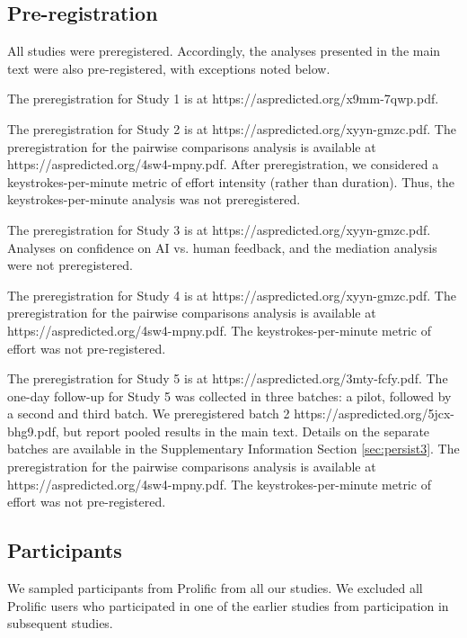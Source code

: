 \documentclass[11pt]{report}
\begin{document}
\begin{mainf}
\subsection*{Pre-registration}
All studies were preregistered. Accordingly, the analyses presented in the main text were also pre-registered, with exceptions noted below. 

The preregistration for Study 1 is at https://aspredicted.org/x9mm-7qwp.pdf. 

The preregistration for Study 2 is at https://aspredicted.org/xyyn-gmzc.pdf.
The preregistration for the pairwise comparisons analysis is available at  https://aspredicted.org/4sw4-mpny.pdf. 
After preregistration, we considered a keystrokes-per-minute metric of effort intensity (rather than duration). Thus, the keystrokes-per-minute analysis was not preregistered.

The preregistration for Study 3 is at https://aspredicted.org/xyyn-gmzc.pdf. Analyses on confidence on AI vs. human feedback, and the mediation analysis were not preregistered.

The preregistration for Study 4 is at https://aspredicted.org/xyyn-gmzc.pdf.
The preregistration for the pairwise comparisons analysis is available at https://aspredicted.org/4sw4-mpny.pdf. 
 The keystrokes-per-minute metric of effort was not pre-registered.

The preregistration for Study 5 is at https://aspredicted.org/3mty-fcfy.pdf. 
The one-day follow-up for Study 5 was collected in three batches: a pilot, followed by a second and third batch. 
We preregistered batch 2 https://aspredicted.org/5jcx-bhg9.pdf, but report pooled results in the main text. 
Details on the separate batches are available in the Supplementary Information Section \ref{sec:persist3}. 
The preregistration for the pairwise comparisons analysis is available at https://aspredicted.org/4sw4-mpny.pdf. 
The keystrokes-per-minute metric of effort was not pre-registered.

\subsection*{Participants}
We sampled participants from Prolific from all our studies. We excluded all Prolific users who participated in one of the earlier studies from participation in subsequent studies. 


\end{mainf}
\end{document}
